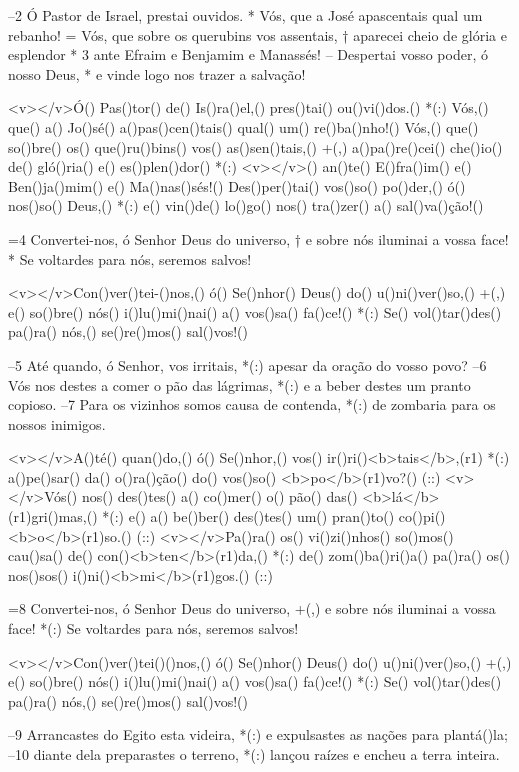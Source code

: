–2 Ó Pastor de Israel, prestai ouvidos. *
Vós, que a José apascentais qual um rebanho!
= Vós, que sobre os querubins vos assentais, †
aparecei cheio de glória e esplendor *
3 ante Efraim e Benjamim e Manassés!
– Despertai vosso poder, ó nosso Deus, *
e vinde logo nos trazer a salvação!

<v></v>Ó() Pas()tor() de() Is()ra()el,() pres()tai() ou()vi()dos.() *(:)
Vós,() que() a() Jo()sé() a()pas()cen()tais() qual() um() re()ba()nho!()
Vós,() que() so()bre() os() que()ru()bins() vos() as()sen()tais,() +(,)
a()pa()re()cei() che()io() de() gló()ria() e() es()plen()dor() *(:)
<v></v>() an()te() E()fra()im() e() Ben()ja()mim() e() Ma()nas()sés!()
Des()per()tai() vos()so() po()der,() ó() nos()so() Deus,() *(:)
e() vin()de() lo()go() nos() tra()zer() a() sal()va()ção!()

=4 Convertei-nos, ó Senhor Deus do universo, †
e sobre nós iluminai a vossa face! *
Se voltardes para nós, seremos salvos!

<v></v>Con()ver()tei-()nos,() ó() Se()nhor() Deus() do() u()ni()ver()so,() +(,)
e() so()bre() nós() i()lu()mi()nai() a() vos()sa() fa()ce!() *(:)
Se() vol()tar()des() pa()ra() nós,() se()re()mos() sal()vos!()

–5 Até quando, ó Senhor, vos irritais, *(:)
apesar da oração do vosso povo?
–6 Vós nos destes a comer o pão das lágrimas, *(:)
e a beber destes um pranto copioso.
–7 Para os vizinhos somos causa de contenda, *(:)
de zombaria para os nossos inimigos.

<v></v>A()té() quan()do,() ó() Se()nhor,() vos() ir()ri()<b>tais</b>,(r1) *(:)
a()pe()sar() da() o()ra()ção() do() vos()so() <b>po</b>(r1)vo?() (::)
<v></v>Vós() nos() des()tes() a() co()mer() o() pão() das() <b>lá</b>(r1)gri()mas,() *(:)
e() a() be()ber() des()tes() um() pran()to() co()pi()<b>o</b>(r1)so.() (::)
<v></v>Pa()ra() os() vi()zi()nhos() so()mos() cau()sa() de() con()<b>ten</b>(r1)da,() *(:)
de() zom()ba()ri()a() pa()ra() os() nos()sos() i()ni()<b>mi</b>(r1)gos.() (::)

=8 Convertei-nos, ó Senhor Deus do universo, +(,)
e sobre nós iluminai a vossa face! *(:)
Se voltardes para nós, seremos salvos!

<v></v>Con()ver()tei()()nos,() ó() Se()nhor() Deus() do() u()ni()ver()so,() +(,)
e() so()bre() nós() i()lu()mi()nai() a() vos()sa() fa()ce!() *(:)
Se() vol()tar()des() pa()ra() nós,() se()re()mos() sal()vos!()

–9 Arrancastes do Egito esta videira, *(:)
e expulsastes as nações para plantá()la;
–10 diante dela preparastes o terreno, *(:)
lançou raízes e encheu a terra inteira.

